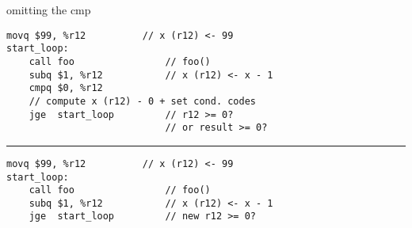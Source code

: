 
\begin{frame}[fragile,label=omitCmp]{omitting the cmp}
\begin{lstlisting}[language=myasm,style=small]
    movq $99, %r12          // x (r12) <- 99
start_loop:
    call foo                // foo()
    subq $1, %r12           // x (r12) <- x - 1
    cmpq $0, %r12  
    // compute x (r12) - 0 + set cond. codes 
    jge  start_loop         // r12 >= 0?
                            // or result >= 0?
\end{lstlisting}
\hrule
\begin{lstlisting}[language=myasm,style=small]
    movq $99, %r12          // x (r12) <- 99
start_loop:
    call foo                // foo()
    subq $1, %r12           // x (r12) <- x - 1
    jge  start_loop         // new r12 >= 0?
\end{lstlisting}
\end{frame}
